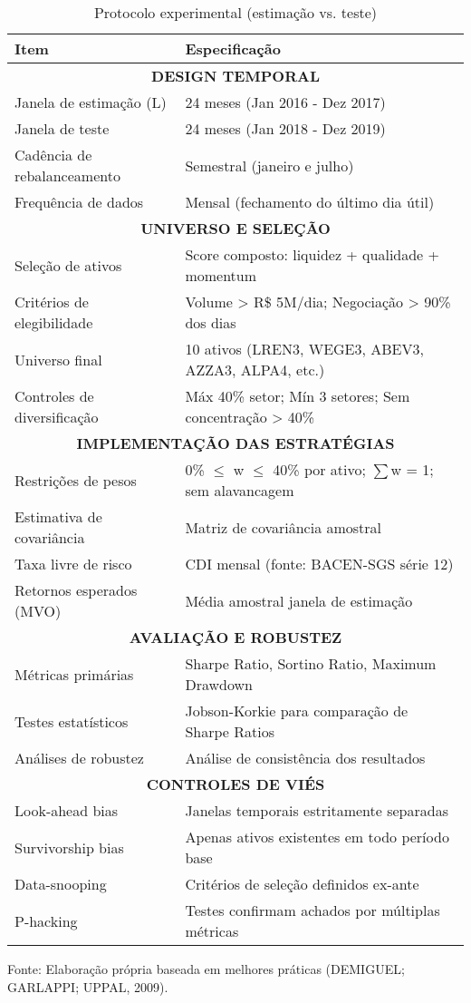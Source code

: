 \begin{table}[H]
\centering
\caption{Protocolo experimental (estimação vs. teste)}
\label{tab:protocolo_experimental}
\begin{tabular}{|l|l|}
\hline
\textbf{Item} & \textbf{Especificação} \\
\hline
\multicolumn{2}{|c|}{\textbf{DESIGN TEMPORAL}} \\
\hline
Janela de estimação (L) & 24 meses (Jan 2016 - Dez 2017) \\
Janela de teste & 24 meses (Jan 2018 - Dez 2019) \\
Cadência de rebalanceamento & Semestral (janeiro e julho) \\
Frequência de dados & Mensal (fechamento do último dia útil) \\
\hline
\multicolumn{2}{|c|}{\textbf{UNIVERSO E SELEÇÃO}} \\
\hline
Seleção de ativos & Score composto: liquidez + qualidade + momentum \\
Critérios de elegibilidade & Volume > R\$ 5M/dia; Negociação > 90\% dos dias \\
Universo final & 10 ativos (LREN3, WEGE3, ABEV3, AZZA3, ALPA4, etc.) \\
Controles de diversificação & Máx 40\% setor; Mín 3 setores; Sem concentração > 40\% \\
\hline
\multicolumn{2}{|c|}{\textbf{IMPLEMENTAÇÃO DAS ESTRATÉGIAS}} \\
\hline
Restrições de pesos & 0\% $\leq$ w $\leq$ 40\% por ativo; $\sum$w = 1; sem alavancagem \\
Estimativa de covariância & Matriz de covariância amostral \\
Taxa livre de risco & CDI mensal (fonte: BACEN-SGS série 12) \\
Retornos esperados (MVO) & Média amostral janela de estimação \\
\hline
\multicolumn{2}{|c|}{\textbf{AVALIAÇÃO E ROBUSTEZ}} \\
\hline
Métricas primárias & Sharpe Ratio, Sortino Ratio, Maximum Drawdown \\
Testes estatísticos & Jobson-Korkie para comparação de Sharpe Ratios \\
Análises de robustez & Análise de consistência dos resultados \\
\hline
\multicolumn{2}{|c|}{\textbf{CONTROLES DE VIÉS}} \\
\hline
Look-ahead bias & Janelas temporais estritamente separadas \\
Survivorship bias & Apenas ativos existentes em todo período base \\
Data-snooping & Critérios de seleção definidos ex-ante \\
P-hacking & Testes confirmam achados por múltiplas métricas \\
\hline
\end{tabular}
\footnotesize
Fonte: Elaboração própria baseada em melhores práticas (DEMIGUEL; GARLAPPI; UPPAL, 2009).
\end{table}

